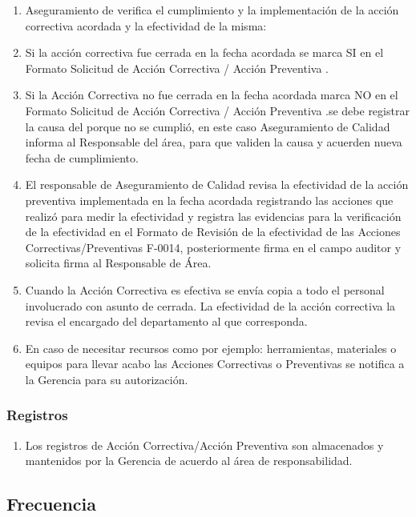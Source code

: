 \begin{enumerate}
	\item Aseguramiento de verifica el cumplimiento y la implementación de la acción correctiva acordada y la efectividad de la misma:
	\item Si la acción correctiva fue cerrada en la fecha acordada se marca SI en el Formato Solicitud de Acción Correctiva / Acción Preventiva \RAC.
	\item Si la Acción Correctiva no fue cerrada en la fecha acordada marca NO en el Formato Solicitud de Acción Correctiva / Acción Preventiva \RAC.se debe registrar la causa del porque no se cumplió, en este caso Aseguramiento de Calidad informa al Responsable del área, para que validen la causa y acuerden nueva fecha de cumplimiento.
	\item El responsable de Aseguramiento de Calidad revisa la efectividad de la acción preventiva implementada en la fecha acordada registrando las acciones que realizó para medir la efectividad y registra las evidencias para la verificación de la efectividad en el Formato de Revisión de la efectividad de las Acciones Correctivas/Preventivas F-0014, posteriormente firma en el campo auditor y solicita firma al Responsable de Área.
	\item Cuando la Acción Correctiva es efectiva se envía copia a todo el personal involucrado con asunto de cerrada. La efectividad de la acción correctiva la revisa el encargado del departamento al que corresponda.
	\item En caso de necesitar recursos como por ejemplo: herramientas, materiales o equipos para llevar acabo las Acciones Correctivas o Preventivas se notifica a la Gerencia para su autorización.
\end{enumerate}

\subsubsection{Registros}

\begin{enumerate}
	\item Los registros de Acción Correctiva/Acción Preventiva son almacenados y mantenidos por la Gerencia de acuerdo al área de responsabilidad.
\end{enumerate}

\subsection{Frecuencia}

